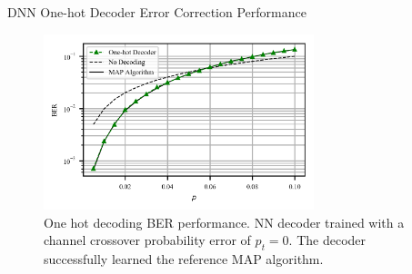 \documentclass{beamer}
\begin{document}
\begin{frame}{DNN One-hot Decoder Error Correction Performance}

   \begin{figure}[!ht]
  \centering
    \includegraphics[width=0.7\textwidth]{images/MLNN1H_Mep_16384_ptrain_0}
    \caption{One hot decoding BER performance. NN decoder trained with a channel crossover probability error of $p_t=0$. The decoder successfully learned the reference MAP algorithm.}\label{fig:1HD}
\end{figure}

\end{frame}
\end{document}

